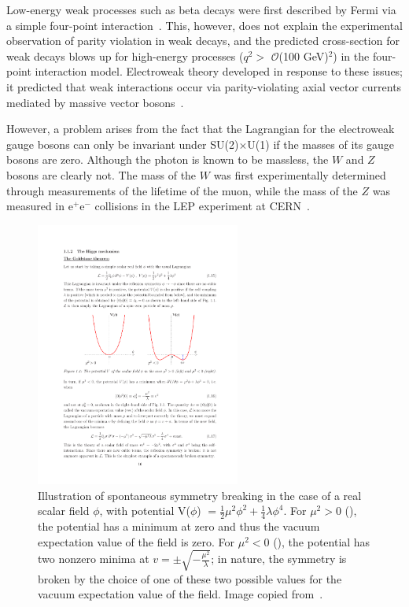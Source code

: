 Low-energy weak processes such as beta decays were first described by Fermi via a simple four-point interaction~\cite{0034-4885-42-12-001}. This, however, does not explain the experimental observation of parity violation in weak decays, and the predicted cross-section for weak decays blows up for high-energy processes ($q^2 >$ $\mathcal{O}$(100 GeV)$^2$) in the four-point interaction model. Electroweak theory developed in response to these issues; it predicted that weak interactions occur via parity-violating axial vector currents mediated by massive vector bosons~\cite{PerkinsPhysics}.

However, a problem arises from the fact that the Lagrangian for the electroweak gauge bosons can only be invariant under SU(2)$\times$U(1) if the masses of its gauge bosons are zero. Although the photon is known to be massless, the $W$ and $Z$ bosons are clearly not. The mass of the $W$ was first experimentally determined through measurements of the lifetime of the muon, while the mass of the $Z$ was measured in e$^{+}$e$^{-}$ collisions in the LEP experiment at CERN~\cite{ThomsonPhysics}.

\begin{figure}
   \begin{center}
      \includegraphics[width=0.6\textwidth]{figures/intro-Higgspotential}
      \caption{Illustration of spontaneous symmetry breaking in the case of a real scalar field $\phi$, with potential V($\phi$) $= \frac{1}{2}\mu^2\phi^2 + \frac{1}{4}\lambda\phi^4$. For $\mu^2 > 0$ (\cmsLeft), the potential has a minimum at zero and thus the vacuum expectation value of the field is zero. For $\mu^2 < 0$ (\cmsRight), the potential has two nonzero minima at $v = \pm\sqrt{-\frac{\mu^2}{\lambda}}$; in nature, the symmetry is broken by the choice of one of these two possible values for the vacuum expectation value of the field. Image copied from~\cite{Djouadi:2005gi}.}
      \label{fig:higgspotential}
   \end{center}
\end{figure}

